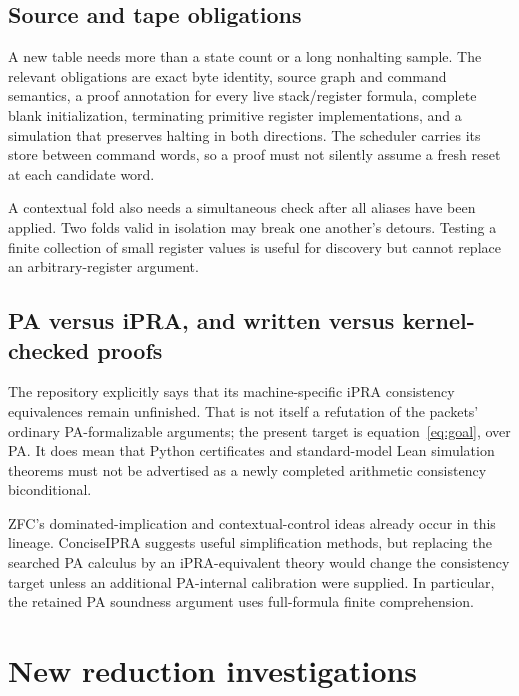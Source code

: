 \documentclass[11pt]{article}
\begin{document}
\subsection{Source and tape obligations}
A new table needs more than a state count or a long nonhalting sample. The relevant obligations are exact byte identity, source graph and command semantics, a proof annotation for every live stack/register formula, complete blank initialization, terminating primitive register implementations, and a simulation that preserves halting in both directions. The scheduler carries its store between command words, so a proof must not silently assume a fresh reset at each candidate word.

A contextual fold also needs a simultaneous check after all aliases have been applied. Two folds valid in isolation may break one another's detours. Testing a finite collection of small register values is useful for discovery but cannot replace an arbitrary-register argument.

\subsection{PA versus iPRA, and written versus kernel-checked proofs}
The repository explicitly says that its machine-specific iPRA consistency equivalences remain unfinished.\cite{repo} That is not itself a refutation of the packets' ordinary PA-formalizable arguments; the present target is equation~\eqref{eq:goal}, over PA. It does mean that Python certificates and standard-model Lean simulation theorems must not be advertised as a newly completed arithmetic consistency biconditional.

ZFC's dominated-implication and contextual-control ideas already occur in this lineage. ConciseIPRA suggests useful simplification methods, but replacing the searched PA calculus by an iPRA-equivalent theory would change the consistency target unless an additional PA-internal calibration were supplied. In particular, the retained PA soundness argument uses full-formula finite comprehension.\cite{zfc,ipra}

\section{New reduction investigations}

\end{document}
